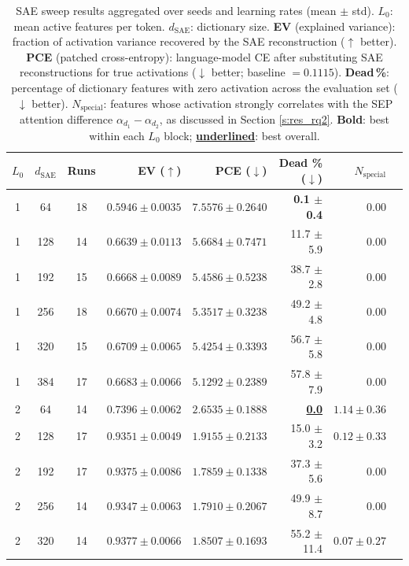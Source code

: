 \begin{table}[htbp]
\centering
\caption{SAE sweep results aggregated over seeds and learning rates (mean $\pm$ std). $L_0$: mean active features per token. $d_\text{SAE}$: dictionary size. \textbf{EV} (explained variance): fraction of activation variance recovered by the SAE reconstruction ($\uparrow$ better). \textbf{PCE} (patched cross-entropy): language-model CE after substituting SAE reconstructions for true activations ($\downarrow$ better; baseline $= 0.1115$). \textbf{Dead\,\%}: percentage of dictionary features with zero activation across the evaluation set ($\downarrow$ better). $N_\text{special}$: features whose activation strongly correlates with the SEP attention difference $\alpha_{d_1}-\alpha_{d_2}$, as discussed in Section \ref{s:res_rq2}. \textbf{Bold}: best within each $L_0$ block; \underline{\textbf{underlined}}: best overall.}
\label{tab:sae_sweep}
\begin{tabular}{cccrrrrr}
\toprule
$L_0$ & $d_\text{SAE}$ & Runs & EV ($\uparrow$) & PCE ($\downarrow$) & Dead \% ($\downarrow$) & $N_\text{special}$ \\
\midrule
  1 & 64 & 18 & $0.5946 \pm 0.0035$ & $7.5576 \pm 0.2640$ & \textbf{0.1 $\pm$ 0.4} & 0.00 \\
  1 & 128 & 14 & $0.6639 \pm 0.0113$ & $5.6684 \pm 0.7471$ & 11.7 $\pm$ 5.9 & 0.00 \\
  1 & 192 & 15 & $0.6668 \pm 0.0089$ & $5.4586 \pm 0.5238$ & 38.7 $\pm$ 2.8 & 0.00 \\
  1 & 256 & 18 & $0.6670 \pm 0.0074$ & $5.3517 \pm 0.3238$ & 49.2 $\pm$ 4.8 & 0.00 \\
  1 & 320 & 15 & $\mathbf{0.6709 \pm 0.0065}$ & $5.4254 \pm 0.3393$ & 56.7 $\pm$ 5.8 & 0.00 \\
  1 & 384 & 17 & $0.6683 \pm 0.0066$ & $\mathbf{5.1292 \pm 0.2389}$ & 57.8 $\pm$ 7.9 & 0.00 \\
\midrule
  2 & 64 & 14 & $0.7396 \pm 0.0062$ & $2.6535 \pm 0.1888$ & \underline{\textbf{0.0}} & $1.14 \pm 0.36$ \\
  2 & 128 & 17 & $0.9351 \pm 0.0049$ & $1.9155 \pm 0.2133$ & 15.0 $\pm$ 3.2 & $0.12 \pm 0.33$ \\
  2 & 192 & 17 & $0.9375 \pm 0.0086$ & $1.7859 \pm 0.1338$ & 37.3 $\pm$ 5.6 & 0.00 \\
  2 & 256 & 14 & $0.9347 \pm 0.0063$ & $1.7910 \pm 0.2067$ & 49.9 $\pm$ 8.7 & 0.00 \\
  2 & 320 & 14 & $\mathbf{0.9377 \pm 0.0066}$ & $1.8507 \pm 0.1693$ & 55.2 $\pm$ 11.4 & $0.07 \pm 0.27$ \\

\end{tabular}
\end{table}
